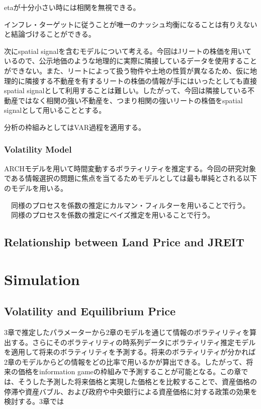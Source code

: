 \documentclass{jsarticle}
\begin{document}
etaが十分小さい時には相関を無視できる。






インフレ・ターゲットに従うことが唯一のナッシュ均衡になることは有りえないと結論づけることができる。



次にspatial signalを含むモデルについて考える。今回はJリートの株価を用いているので、公示地価のような地理的に実際に隣接しているデータを使用することができない。また、リートによって扱う物件や土地の性質が異なるため、仮に地理的に隣接する不動産を有するリートの株価の情報が手にはいったとしても直接spatial signalとして利用することは難しい。したがって、今回は隣接している不動産ではなく相関の強い不動産を、つまり相関の強いリートの株価をspatial signalとして用いることとする。

分析の枠組みとしてはVAR過程を適用する。

\subsubsection{Volatility Model}
ARCHモデルを用いて時間変動するボラティリティを推定する。今回の研究対象である情報選択の問題に焦点を当てるためモデルとしては最も単純とされる以下のモデルを用いる。


　同様のプロセスを係数の推定にカルマン・フィルターを用いることで行う。\\
　同様のプロセスを係数の推定にベイズ推定を用いることで行う。

\subsection{Relationship between Land Price and JREIT}

\section{Simulation}
\subsection{Volatility and Equilibrium Price}
3章で推定したパラメーターから2章のモデルを通じて情報のボラティリティを算出する。さらにそのボラティリティの時系列データにボラティリティ推定モデルを適用して将来のボラティリティを予測する。将来のボラティリティが分かれば2章のモデルからどの情報をどの比率で用いるかが算出できる。したがって、将来の価格をinformation gameの枠組みで予測することが可能となる。この章では、そうした予測した将来価格と実現した価格とを比較することで、資産価格の停滞や資産バブル、および政府や中央銀行による資産価格に対する政策の効果を検討する。3章では
\end{document}
